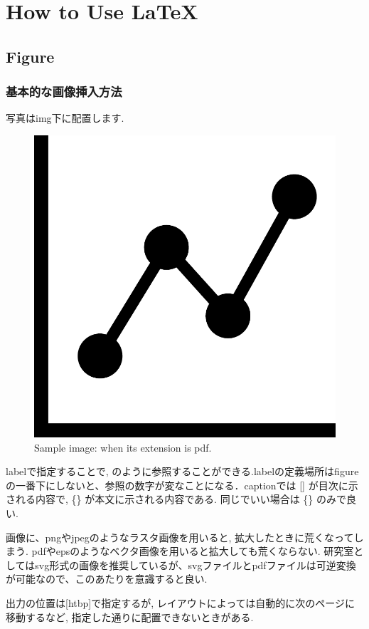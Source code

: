 \chapter{How to Use \LaTeX }

\section{Figure}
\subsection{基本的な画像挿入方法}
写真はimg下に配置します.
\begin{figure}[htbp]
    \centering   
    \includegraphics[width=0.5\columnwidth]{./img/sample_pdf.pdf}
    \caption{Sample image: when its extension is pdf.} %
    \label{fig:sample_pdf} %
\end{figure}

labelで指定することで, のように参照することができる.labelの定義場所はfigureの一番下にしないと、参照の数字が変なことになる．captionでは [] が目次に示される内容で, \{\} が本文に示される内容である. 同じでいい場合は \{\} のみで良い.

画像に、pngやjpegのようなラスタ画像を用いると, 拡大したときに荒くなってしまう. pdfやepsのようなベクタ画像を用いると拡大しても荒くならない. 研究室としてはsvg形式の画像を推奨しているが、svgファイルとpdfファイルは可逆変換が可能なので、このあたりを意識すると良い.

出力の位置は[htbp]で指定するが, レイアウトによっては自動的に次のページに移動するなど, 指定した通りに配置できないときがある.

